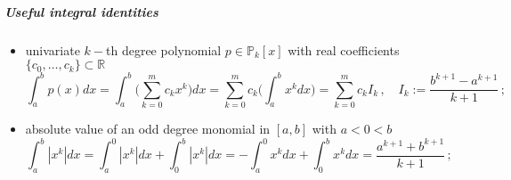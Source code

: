 \documentclass[../main.tex]{subfiles}
\begin{document}
\subparagraph{Useful integral identities}\label{subpar:int_id}
\begin{itemize}
        \item univariate $k-$th degree polynomial $p\in \mathbb{P}_{k}[x]$ with real coefficients $\{c_{0},\dots,c_{k}\}\subset\mathbb{R}$
                \begin{equation}\label{eq:pol_int}
                        \int_{a}^{b} p(x) dx = \int_{a}^{b}\bigg(\sum_{k=0}^{m}c_{k}x^{k}\bigg)dx = \sum_{k=0}^{m}c_{k}\bigg(\int_{a}^{b} x^{k} dx \bigg) = \sum_{k=0}^{m}c_{k}I_{k}\,,\quad I_{k}:=\frac{b^{k+1} - a^{k+1}}{k+1}\,;
                \end{equation}
        \item absolute value of an odd degree monomial in $[a,b]$ with $a < 0 < b$
                \begin{equation}\label{eq:abs_mon_int}
                        \int_{a}^{b}|x^{k}|dx = \int_{a}^{0}|x^{k}|dx + \int_{0}^{b}|x^{k}|dx = - \int_{a}^{0} x^{k} dx + \int_{0}^{b} x^{k} dx = \frac{a^{k+1} + b^{k+1}}{k+1}\,;
                \end{equation}
\end{itemize}
\end{document}
